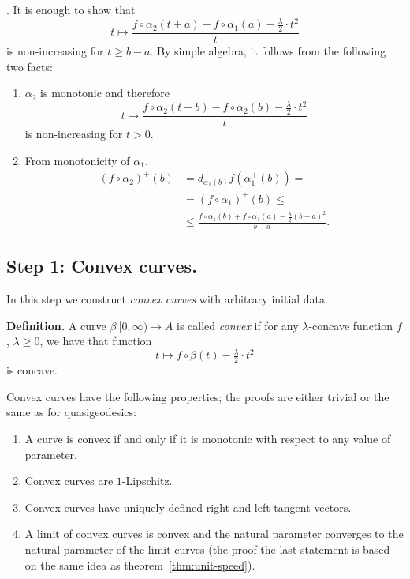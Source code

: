 \documentclass{article}
\begin{document}
\Proof.
It is enough to show that 
$$t 
\mapsto 
\frac{f\circ\alpha_2(t+a)-f\circ\alpha_1(a)-\tfrac\lambda2{\cdot}t^2}t
$$
is non-increasing for $t\ge b-a$.
By simple algebra, it follows from the following two facts:
\begin{enumerate}[$\diamond$]
\item $\alpha_2$ is monotonic and therefore
$$t 
\mapsto 
\frac{f\circ\alpha_2(t+b)-f\circ\alpha_2(b)-\tfrac\lambda2{\cdot}t^2}t$$
is non-increasing for $t>0$.
\item From monotonicity of $\alpha_1$,
\begin{align*}
(f\circ\alpha_2)^+(b)
&=
d_{\alpha_1(b)}
f(\alpha_1^+(b))
=
\\
&=
(f\circ\alpha_1)^+(b)
\le
\\
&\le\frac{f\circ\alpha_1(b)+f\circ\alpha_1(a)-\tfrac\lambda2 (b-a)^2}{b-a}.
\end{align*}

\end{enumerate}
\qedsf

\subsection{Step 1: Convex curves.} \label{step1}

In this step we construct \emph{convex curves} with arbitrary initial data.

\begin{thm}{\bf Definition.}
A curve $\beta\:[0,\infty)\to A$ is called \emph{convex} if for any
$\lambda$-concave function $f$, $\lambda\ge 0$, we have that function $$t\mapsto
f\circ\beta(t)-\tfrac\lambda2{\cdot}t^2$$
is concave. 
\end{thm}


Convex curves have the following properties; the proofs are either trivial or the
same as for quasigeodesics:

\begin{enumerate}
\item\label{conv-mono} A curve is convex if and only if it is monotonic with
respect to any value of parameter.
\item\label{conv-lip} Convex curves are $1$-Lipschitz.
\item\label{conv-tang} Convex curves have uniquely defined right and left
tangent vectors.
\item\label{limit-convex} A limit of convex curves is convex and the natural parameter converges to the natural parameter of the limit curves (the proof the last statement is based on the same idea as theorem~\ref{thm:unit-speed}).
\end{enumerate}
\end{document}
